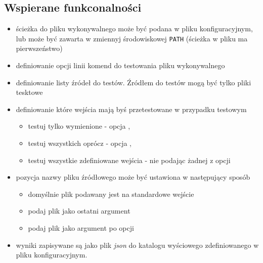 \documentclass[a4paper,12pt]{article}
\begin{document}
\subsection{Wspierane funkconalności}
\begin{itemize}
  \item ścieżka do pliku wykonywalnego może być podana w pliku konfiguracyjnym, lub może być zawarta w zmiennyj środowiskowej \texttt{PATH} (ścieżka w pliku ma pierwszeństwo)
  \item definiowanie opcji linii komend do testowania pliku wykonywalnego
  \item definiowanie listy źródeł do testów. Źródłem do testów mogą być tylko pliki tesktowe
  \item definiowanie które wejścia mają byś przetestowane w przypadku testowym
    \begin{itemize}
      \item testuj tylko wymienione - opcja ,
      \item testuj wszystkich oprócz - opcja ,
      \item testuj wszystkie zdefiniowane wejścia - nie podając żadnej z opcji
    \end{itemize}
  \item pozycja nazwy pliku źródłowego może być ustawiona w następujący sposób
    \begin{itemize}
      \item domyślnie plik podawany jest na standardowe wejście
      \item podaj plik jako ostatni argument 
      \item podaj plik jako argument po opcji 
    \end{itemize}
  \item wyniki zapisywane są jako plik \textit{json} do katalogu wyściowego zdefiniowanego w pliku konfiguracyjnym.
\end{itemize}

\end{document}
